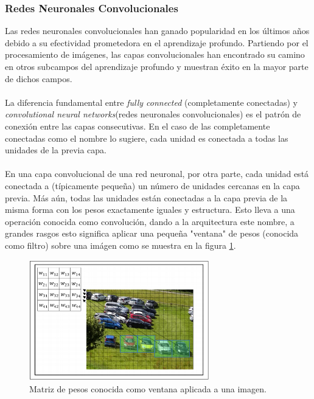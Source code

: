     \subsubsection{Redes Neuronales Convolucionales}
    Las redes neuronales convolucionales han ganado popularidad en los últimos años debido a su efectividad prometedora en el aprendizaje profundo. Partiendo por el procesamiento de imágenes, las capas convolucionales han encontrado su camino en otros subcampos del aprendizaje profundo y muestran éxito en la mayor parte de dichos campos.\\\\ 
    La diferencia fundamental entre \textit{fully connected} (completamente conectadas) y \textit{convolutional neural networks}(redes neuronales convolucionales) es el patrón de conexión entre las capas consecutivas. En el caso de las completamente conectadas como el nombre lo sugiere, cada unidad es conectada a todas las unidades de la previa capa. \\\\
    En una capa convolucional de una red neuronal, por otra parte, cada unidad está conectada a (típicamente pequeña) un número de unidades cercanas en la capa previa. Más aún, todas las unidades están conectadas a la capa previa de la misma forma con los pesos exactamente iguales y estructura. Esto lleva a una operación conocida como convolución, dando a la arquitectura este nombre, a grandes rasgos esto significa aplicar una pequeña "ventana" de pesos (conocida como filtro) sobre una imágen como se muestra en la figura \ref{fig:CNNFilter}.
    
    
     \begin{figure}[H]
        \centering
        \includegraphics[width=0.7\textwidth]{capitulo2/images/CNN_window.png}
        \caption{Matriz de pesos conocida como ventana aplicada a una imagen.}
        \label{fig:CNNFilter}
    \end{figure}
    \newpage
    
